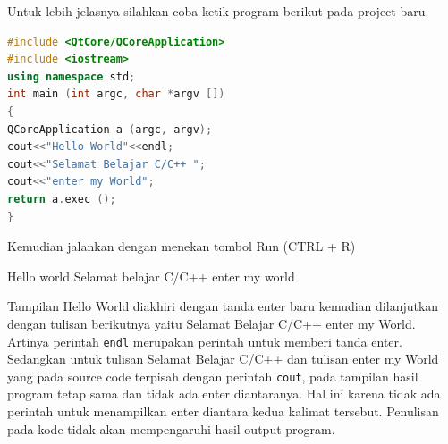 Untuk lebih jelasnya silahkan coba ketik program berikut pada project
baru.

\begin{lstlisting}[language=c++, caption= struktur program C++]
#include <QtCore/QCoreApplication>  
#include <iostream>  
using namespace std;  
int main (int argc, char *argv [])  
{  
QCoreApplication a (argc, argv);  
cout<<"Hello World"<<endl;  
cout<<"Selamat Belajar C/C++ ";  
cout<<"enter my World";  
return a.exec ();  
}
\end{lstlisting}

Kemudian jalankan dengan menekan tombol Run (CTRL + R)

\begin{lcverbatim}
Hello world
Selamat belajar C/C++ enter my world
\end{lcverbatim}


Tampilan Hello World diakhiri dengan tanda enter baru kemudian
dilanjutkan dengan tulisan berikutnya yaitu Selamat Belajar C/C++ enter
my World. Artinya perintah \texttt{endl} merupakan perintah untuk
memberi tanda enter. Sedangkan untuk tulisan Selamat Belajar C/C++ dan
tulisan enter my World yang pada source code terpisah dengan perintah
\texttt{cout}, pada tampilan hasil program tetap sama dan tidak ada
enter diantaranya. Hal ini karena tidak ada perintah untuk menampilkan
enter diantara kedua kalimat tersebut. Penulisan pada kode tidak akan
mempengaruhi hasil output program.
